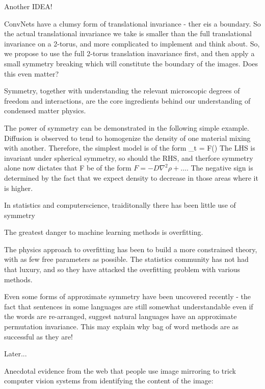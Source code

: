 \documentclass[twocolumn, prl]{revtex4-1}
\begin{document}
Another IDEA!

ConvNets have a clumsy form of translational invariance - ther eis a boundary. So the actual translational invariance we take is smaller than the full translational invariance on a 2-torus, and more complicated to implement and think about. So, we propose to use the full 2-torus translation inavariance first, and then apply a small symmetry breaking which will constitute the boundary of the images. Does this even matter?




Symmetry, together with understanding the relevant microscopic degrees of freedom and interactions, are the core ingredients behind our understanding of condensed matter physics.


The power of symmetry can be demonstrated in the following simple example. Diffusion is observed to tend to homogenize the density of one material mixing with another. Therefore, the simplest model is of the form
\be
\partial_t \rho = F(\nabla \rho)
\ee
The LHS is invariant under spherical symmetry, so should the RHS, and therfore
symmetry alone now dictates that F be of the form $F = - D \nabla^2 \rho + \ldots$.
The negative sign is determined by the fact that we expect density to decrease in those areas where it is higher.


In statistics and computerscience, traiditonally there has been little use of symmetry


The greatest danger to machine learning methods is overfitting.

The physics approach to overfitting has been to build a more constrained theory, with as few free parameters as possible. The statistics community has not had that luxury, and so they have attacked the overfitting problem with various methods.

Even some forms of approximate symmetry have been uncovered recently - the fact that sentences in some languages are still somewhat understandable even if the words are re-arranged, suggest natural languages have an approximate permutation invariance. This may explain why bag of word methods are as successful as they are!

Later...

Anecdotal evidence from the web that people use image mirroring to trick computer vision systems from identifying the content of the image:

\end{document}
